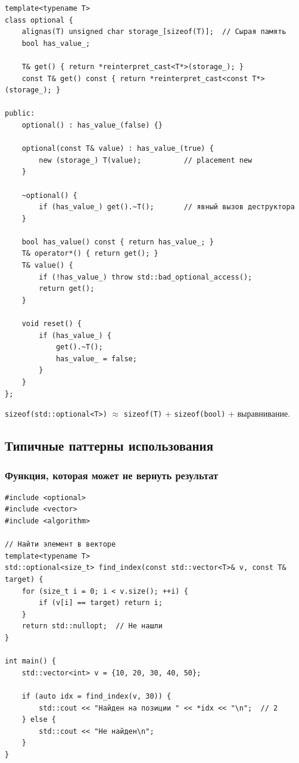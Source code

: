 \documentclass[a4paper,12pt]{article}
\begin{document}
\begin{lstlisting}
template<typename T>
class optional {
    alignas(T) unsigned char storage_[sizeof(T)];  // Сырая память
    bool has_value_;

    T& get() { return *reinterpret_cast<T*>(storage_); }
    const T& get() const { return *reinterpret_cast<const T*>(storage_); }

public:
    optional() : has_value_(false) {}

    optional(const T& value) : has_value_(true) {
        new (storage_) T(value);          // placement new
    }

    ~optional() {
        if (has_value_) get().~T();       // явный вызов деструктора
    }

    bool has_value() const { return has_value_; }
    T& operator*() { return get(); }
    T& value() {
        if (!has_value_) throw std::bad_optional_access();
        return get();
    }

    void reset() {
        if (has_value_) {
            get().~T();
            has_value_ = false;
        }
    }
};
\end{lstlisting}

\texttt{sizeof(std::optional<T>)} $\approx$ \texttt{sizeof(T)} + \texttt{sizeof(bool)}
+ выравнивание.

\subsection{Типичные паттерны использования}

\subsubsection{Функция, которая может не вернуть результат}

\begin{lstlisting}
#include <optional>
#include <vector>
#include <algorithm>

// Найти элемент в векторе
template<typename T>
std::optional<size_t> find_index(const std::vector<T>& v, const T& target) {
    for (size_t i = 0; i < v.size(); ++i) {
        if (v[i] == target) return i;
    }
    return std::nullopt;  // Не нашли
}

int main() {
    std::vector<int> v = {10, 20, 30, 40, 50};

    if (auto idx = find_index(v, 30)) {
        std::cout << "Найден на позиции " << *idx << "\n";  // 2
    } else {
        std::cout << "Не найден\n";
    }
}
\end{lstlisting}
\end{document}

